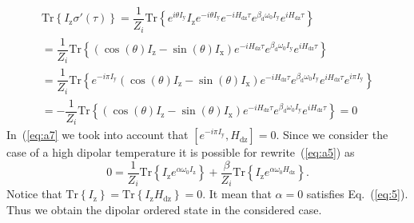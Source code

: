\documentclass[review]{elsarticle}
\newcommand{\tr}[1]{\mathrm{Tr} \left\{ #1 \right\}}
\newcommand{\sx}{I_\mathrm{x}}
\newcommand{\sy}{I_\mathrm{y}}
\newcommand{\sz}{I_\mathrm{z}}
\newcommand{\hdz}{H_\mathrm{dz}}
\begin{document}
\begin{multline}
    \label{eq:a7} 
    \tr{I_\mathrm{z} \sigma'(\tau)}
    =  \dfrac{1}{Z_{i}} \tr{
        e^{i \theta \sy} \sz e^{-i \theta \sy}
        e^{-i \hdz \tau} e^{\beta_\mathrm{d} \omega_{0} \sy} e^{i \hdz \tau}
    } 
    \\
    = \dfrac{1}{Z_i} \tr{
        \left( \cos(\theta) \sz - \sin(\theta) \sx \right) 
        e^{-i \hdz \tau} e^{\beta_\mathrm{d} \omega_{0} \sy} e^{i \hdz \tau}
    }
    \\
    = \dfrac{1}{Z_i} \tr{
        e^{-i \pi \sy}  
        \left( \cos(\theta) \sz - \sin(\theta) \sx \right) 
        e^{-i \hdz \tau} e^{\beta_\mathrm{d} \omega_{0} \sy} e^{i \hdz \tau}
        e^{i \pi \sy}  
    }
    \\
    = - \dfrac{1}{Z_i} \tr{
        \left( \cos(\theta) \sz - \sin(\theta) \sx \right) 
        e^{-i \hdz \tau} e^{\beta_\mathrm{d} \omega_{0} \sy} e^{i \hdz \tau} 
    } = 0
\end{multline}
%
In~(\ref{eq:a7} we took into account that $\left[ e^{-i \pi \sy}, \hdz \right] = 0$.
Since we consider the case of a high dipolar temperature it is possible for rewrite~(\ref{eq:a5}) as
\begin{equation}
    \label{eq:a8}
    0 = \dfrac{1}{Z_i} \tr{ \sz e^{\alpha \omega_0 \sz}}
    + \dfrac{\beta}{Z_i} \tr{\sz e^{\alpha \omega_0 \hdz}}.
\end{equation}
%
Notice that $\tr{\sz} = \tr{\sz\hdz} = 0$. It mean that $\alpha = 0$ satisfies Eq.~(\ref{eq:5}). 
Thus we obtain the dipolar ordered state in the considered case.


\end{document}
